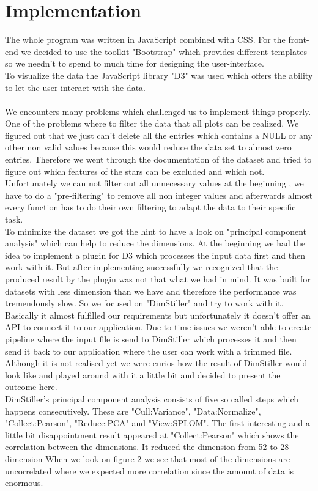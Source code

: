 \documentclass{vgtc}                          %
\begin{document}
\section{Implementation}
The whole program was written in JavaScript combined with CSS. For the front-end we decided to use the toolkit "Bootstrap"\cite{bootstrap} which provides different templates so we needn't to spend to much time for designing the user-interface.\\
To visualize the data the JavaScript library "D3"\cite{d3} was used which offers the ability to let the user interact with the data.\\
\\
We encounters many problems which challenged us to implement things properly. One of the problems where to filter the data that all plots can be realized. We figured out that we just can't delete all the entries which contains a NULL or any other non valid values because this would reduce the data set to almost zero entries. Therefore we went through the documentation of the dataset and tried to figure out which features of the stars can be excluded and which not. Unfortunately we can not filter out all unnecessary values at the beginning , we have to do a "pre-filtering" to remove all non integer values and afterwards almost every function has to do their own filtering to adapt the data to their specific task.\\
To minimize the dataset we got the hint to have a look on "principal component analysis" which can help to reduce the dimensions. At the beginning we had the idea to implement a plugin\cite{pca} for D3 which processes the input data first and then work with it. But after implementing successfully we recognized that the produced result by the plugin was not that what we had in mind. It was built for datasets with less dimension than we have and therefore the performance was tremendously slow. So we focused on "DimStiller"\cite{dimstiller} and try to work with it. Basically it almost fulfilled our requirements but unfortunately it doesn't offer an API to connect it to our application. Due to time issues we weren't able to create pipeline where the input file is send to DimStiller which processes it and then send it back to our application where the user can work with a trimmed file. Although it is not realised yet we were curios how the result of DimStiller would look like and played around with it a little bit and decided to present the outcome here.\\
DimStiller's principal component analysis consists of five so called steps which happens consecutively. These are "Cull:Variance", "Data:Normalize", "Collect:Pearson", "Reduce:PCA" and "View:SPLOM". The first interesting and a little bit disappointment result appeared at "Collect:Pearson" which shows the correlation between the dimensions. It reduced the dimension from 52 to 28 dimension When we look on figure 2 we see that most of the dimensions are uncorrelated where we expected more correlation since the amount of data is enormous. 
\end{document}
